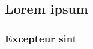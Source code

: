 \documentclass{./llncs2e/llncs}
\begin{document}
\subsection{Lorem ipsum}

\subsubsection{Excepteur sint}










% 
% 




% 
% 

 

\end{document}
